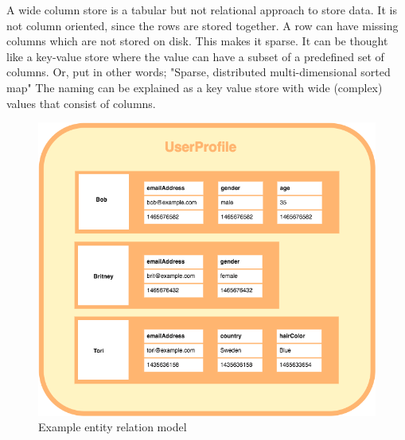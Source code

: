 A wide column store is a tabular but not relational approach to store data. It is not column oriented, since the rows are stored together. A row can have missing columns which are not stored on disk. This makes it sparse.
It can be thought like a key-value store where the value can have a subset of a predefined set of columns. Or, put in other words; "Sparse, distributed multi-dimensional sorted map" \cite{chang2008bigtable}
The naming can be explained as a key value store with wide (complex) values that consist of columns.

\begin{figure}[H]
    \centering
    \includegraphics[width=0.75\columnwidth]{img/wide_column_store.png}
    \caption{Example entity relation model \autocite{wideColumnGraphic}}
    \label{fig:cassandra:wide_column}
\end{figure}


